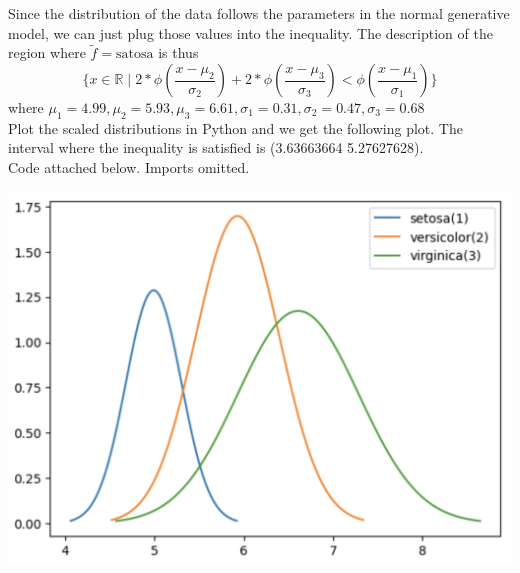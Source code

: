 \documentclass[11pt]{article}
\begin{document}
Since the distribution of the data  follows the parameters in the normal generative model, we can just plug those values into the inequality. The description of the region where $\tilde{f}=\text{satosa}$ is thus 
\begin{equation}
    \{x \in \mathbb{R} \mid 2*\phi (\frac{x-\mu_2}{\sigma_2}) + 2*\phi (\frac{x-\mu_3}{\sigma_3}) < \phi (\frac{x-\mu_1}{\sigma_1})\}
\end{equation}
where $\mu_1=4.99, \mu_2=5.93, \mu_3=6.61, \sigma_1=0.31, \sigma_2=0.47, \sigma_3=0.68$ \\

Plot the scaled distributions in Python and we get the following plot.
The interval where the inequality is satisfied is (3.63663664 5.27627628). \\ Code attached below. Imports omitted.
\begin{center}
    \includegraphics[scale=0.4]{images/p5plot.png}
\end{center}
\end{document}
